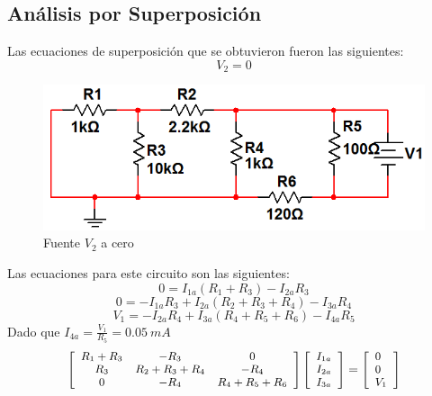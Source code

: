\documentclass[twocolumn]{IEEEtran}
\begin{document}
\subsection{Análisis por Superposición}
\noindent
Las ecuaciones de superposición que se obtuvieron fueron las siguientes:\\
$$V_2 = 0$$
\begin{figure}[H]
	\centering
		\includegraphics[scale=0.45]{c1.png}
	\caption{Fuente $V_2$ a cero}
	\label{fig2}
\end{figure}
\noindent
Las ecuaciones para este circuito son las siguientes:
\begin{equation}
 0 = {I_{1a}}\left( {{R_1} + {R_3}} \right) - {I_{2a}}{R_3}
\end{equation}
\begin{equation}
 0 =  - {I_{1a}}{R_3} + {I_{2a}}\left( {{R_2} + {R_3} + {R_4}} \right) - {I_{3a}}{R_4}
\end{equation}
\begin{equation}
 {V_1} =  - {I_{2a}}{R_4} + {I_{3a}}\left( {{R_4} + {R_5} + {R_6}} \right) - {I_{4a}}{R_5}
\end{equation}
\noindent
Dado que $I_{4a} = \frac{V_1}{R_5} = 0.05 \ mA$
\begin{equation}
\footnotesize
 \left[ {\begin{array}{*{20}{c}}
   {{R_1} + {R_3}} & { - {R_3}} & 0  \\
   {{R_3}} & {{R_2} + {R_3} + {R_4}} & { - {R_4}}  \\
   0 & { - {R_4}} & {{R_4} + {R_5} + {R_6}}  \\
\end{array}} \right]\left[ \begin{array}{l}
 {I_{1a}} \\ 
 {I_{2a}} \\ 
 {I_{3a}} \\ 
 \end{array} \right] = \left[ \begin{array}{l}
 0 \\ 
 0 \\ 
 {V_1} \\ 
 \end{array} \right]
\label{mat2}
\end{equation}
\end{document}
